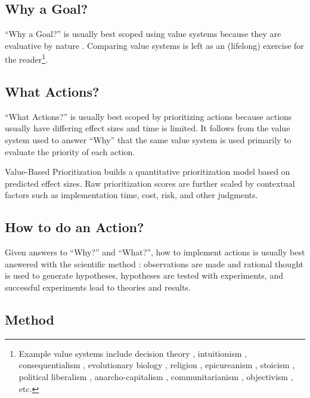 \documentclass[10pt, a4paper, twocolumn]{IEEEconf}
\begin{document}
\subsection{Why a Goal?}

\enquote{Why a Goal?} is usually best scoped using value systems because they are evaluative by nature \citep{value-theory}.
Comparing value systems is left as an (lifelong) exercise for the reader\footnote{Example value systems include decision theory \citep{sep-decision-theory}, intuitionism \citep{huemer2007ethical}, consequentialism \citep{consequentialism}, evolutionary biology \citep{morality-biology}, religion \citep{religion-morality}, epicureanism \citep{epicurus}, stoicism \citep{stoicism}, political liberalism \citep{rawls}, anarcho-capitalism \citep{huemer2013problem}, communitarianism \citep{communitarianism}, objectivism \citep{ayn-rand}, etc.}.

\subsection{What Actions?}

\enquote{What Actions?} is usually best scoped by prioritizing actions because actions usually have differing effect sizes and time is limited.
It follows from the value system used to answer \enquote{Why} that the same value system is used primarily to evaluate the priority of each action.

Value-Based Prioritization builds a quantitative prioritization model based on predicted effect sizes.
Raw prioritization scores are further scaled by contextual factors such as implementation time, cost, risk, and other judgments.

\subsection{How to do an Action?}

Given answers to \enquote{Why?} and \enquote{What?}, how to implement actions is usually best answered with the scientific method \citep{scientific-method,sep-rationalism-empiricism}: observations are made and rational thought is used to generate hypotheses, hypotheses are tested with experiments, and successful experiments lead to theories and results.

\subsection{Method}
\end{document}
